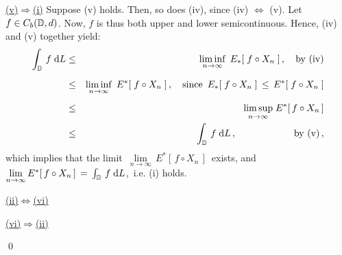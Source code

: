 \vskip 0.5cm \noindent
\underline{(v)\;$\Longrightarrow$\;(i)}
\vskip 0.2cm \noindent
Suppose (v) holds. Then, so does (iv), since (iv) $\Longleftrightarrow$ (v).
Let $f \in C_{b}(\mathbb{D},d)$. Now, $f$ is thus both upper and lower semicontinuous.
Hence, (iv) and (v) together yield:
\begin{eqnarray*}
\int_{\D}\, f \;\d L
& \leq &
	\underset{n\rightarrow\infty}{\liminf}\;\,E_{*}\!\left[\;f \circ X_{n}\;\right],
	\quad\textnormal{by (iv)}
\\
& \overset{{\color{white}+}}{\leq} &
	\underset{n\rightarrow\infty}{\liminf}\;\,E^{*}\!\left[\;f \circ X_{n}\;\right],
	\quad\textnormal{since \,$E_{*}\!\left[\;f \circ X_{n}\;\right] \,\leq\, E^{*}\!\left[\;f \circ X_{n}\;\right]$}
\\
& \overset{{\color{white}+}}{\leq} &
	\underset{n\rightarrow\infty}{\limsup}\; E^{*}\!\left[\,f \circ X_{n}\,\right] 
\\
& \leq &
	\int_{\D}\, f \;\d L\,,
	\quad\quad\quad\quad\quad\quad\textnormal{by (v)}\,,
\end{eqnarray*}
which implies that the limit
\,$\underset{n\rightarrow\infty}{\lim}\, E^{*}\!\left[\,f \circ X_{n}\,\right]$\,
exists, and
\,$\underset{n\rightarrow\infty}{\lim}\, E^{*}\!\left[\,f \circ X_{n}\,\right] \,=\, \int_{\mathbb{D}}\, f \;\textnormal{d} L$,\,
i.e. (i) holds.

\vskip 0.5cm \noindent
\underline{(ii)\;$\Longleftrightarrow$\;(vi)}
\vskip 0.2cm \noindent

\vskip 0.5cm \noindent
\underline{(vi)\;$\Longrightarrow$\;(ii)}
\vskip 0.2cm \noindent

\qed



\renewcommand{\theenumi}{\roman{enumi}}
\renewcommand{\labelenumi}{\textnormal{(\theenumi)}$\;\;$}

